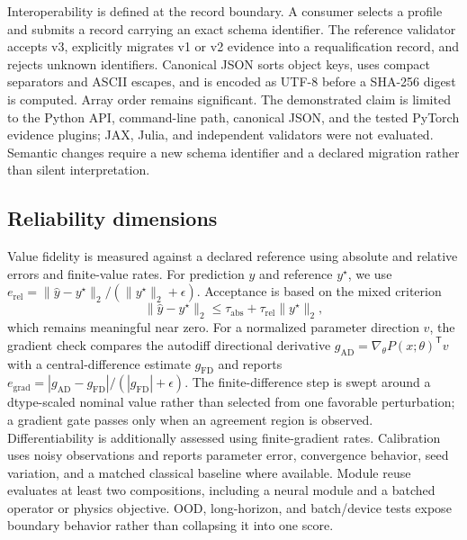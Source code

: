\documentclass[preprint,12pt]{elsarticle}
\begin{document}
Interoperability is defined at the record boundary. A consumer selects a profile and submits a record carrying an exact schema identifier. The reference validator accepts v3, explicitly migrates v1 or v2 evidence into a requalification record, and rejects unknown identifiers. Canonical JSON sorts object keys, uses compact separators and ASCII escapes, and is encoded as UTF-8 before a SHA-256 digest is computed. Array order remains significant. The demonstrated claim is limited to the Python API, command-line path, canonical JSON, and the tested PyTorch evidence plugins; JAX, Julia, and independent validators were not evaluated. Semantic changes require a new schema identifier and a declared migration rather than silent interpretation.

\subsection{Reliability dimensions}
Value fidelity is measured against a declared reference using absolute and relative errors and finite-value rates. For prediction $\hat y$ and reference $y^{\star}$, we use $e_{\mathrm{rel}}=\|\hat y-y^{\star}\|_2/(\|y^{\star}\|_2+\epsilon)$. Acceptance is based on the mixed criterion
\begin{equation}
  \|\hat y-y^{\star}\|_2 \leq
  \tau_{\mathrm{abs}}+\tau_{\mathrm{rel}}\|y^{\star}\|_2,
  \label{eq:mixed-gate}
\end{equation}
which remains meaningful near zero. For a normalized parameter direction $v$, the gradient check compares the autodiff directional derivative $g_{\mathrm{AD}}=\nabla_{\theta}P(x;\theta)^{\mathsf T}v$ with a central-difference estimate $g_{\mathrm{FD}}$ and reports $e_{\mathrm{grad}}=|g_{\mathrm{AD}}-g_{\mathrm{FD}}|/(|g_{\mathrm{FD}}|+\epsilon)$. The finite-difference step is swept around a dtype-scaled nominal value rather than selected from one favorable perturbation; a gradient gate passes only when an agreement region is observed. Differentiability is additionally assessed using finite-gradient rates. Calibration uses noisy observations and reports parameter error, convergence behavior, seed variation, and a matched classical baseline where available. Module reuse evaluates at least two compositions, including a neural module and a batched operator or physics objective. OOD, long-horizon, and batch/device tests expose boundary behavior rather than collapsing it into one score.
\end{document}
